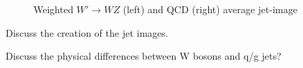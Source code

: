\begin{figure}[bt]
  \begin{center}
  
      \caption{Weighted $W'\rightarrow WZ$ (left) and QCD (right) average jet-image
      \label{fig:meanImages} }
    \end{center}
\end{figure}  

Discuss the creation of the jet images.

Discuss the physical differences between W bosons and q/g jets?
